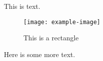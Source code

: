 \documentclass{beamer}
\begin{document}
    \begin{frame}
        This is text.

        \begin{figure}
            \texttt{[image: example-image]}
            \caption{This is a rectangle}
        \end{figure}

        Here is some more text.
    \end{frame}
\end{document}
